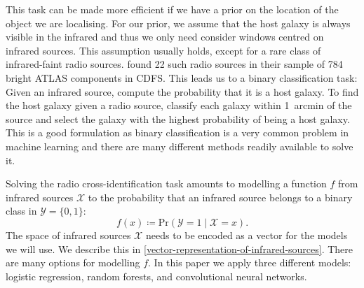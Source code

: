 \documentclass[fleqn,usenatbib,usedcolumn]{mnras}
\newcommand{\cheng}[1]{ {\color{teal}[{\bf Cheng:~{#1}}]} }
\begin{document}
    This task can be made more efficient if we have a prior on the location of
    the object we are localising. For our prior, we assume that the host galaxy
    is always visible in the infrared and thus we only need consider windows
    centred on infrared sources. This assumption usually holds, except for a
    rare class of infrared-faint radio sources. \citet{norris06} found 22 such
    radio sources in their sample of 784 bright ATLAS components in CDFS. This
    leads us to a binary classification task: Given an infrared source, compute
    the probability that it is a host galaxy. To find the host galaxy given a
    radio source, classify each galaxy within 1~arcmin of the source and select
    the galaxy with the highest probability of being a host galaxy. This is a
    good formulation as binary classification is a very common problem in
    machine learning and there are many different methods readily available to
    solve it.

    Solving the radio cross-identification task amounts to modelling a function
    $f$ from infrared sources $\mathcal{X}$ to the probability that an infrared
    source belongs to a binary class in $\mathcal{Y} = \{0, 1\}$:
    \begin{equation}
        f(x) \coloneqq \text{Pr}\left(\mathcal{Y} = 1 \mid \mathcal X = x\right).
    \end{equation}
    The space of infrared sources $\mathcal{X}$ needs to be encoded as a vector
    for the models we will use. We describe this in
    \autoref{vector-representation-of-infrared-sources}. There are many options
    for modelling $f$. In this paper we apply three different models: logistic
    regression, random forests, and convolutional neural networks.
\end{document}
